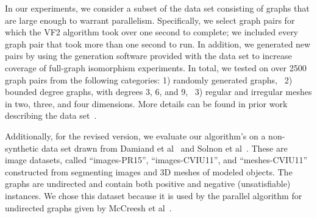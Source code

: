 %
In our experiments, we consider a subset of the data set consisting of
graphs that are large enough to warrant parallelism. 
%
Specifically, we select graph pairs for which the VF2
algorithm took over one second to complete; we included every graph
pair that took more than one second to run.
%
In addition, we generated new pairs by using the generation software
provided with the data set to increase coverage of full-graph
isomorphism experiments.
%
%
%
%
In total, we tested on over 2500 graph pairs from the following
categories:
1) randomly generated graphs,~%
2) bounded degree graphs, with degrees 3, 6, and 9,~
3) regular and irregular meshes in two, three, and four dimensions.
%
%
More details can be found in prior work describing the
data set~\cite{argdatabase1}.

Additionally, for the revised version, we evaluate our algorithm's on
a non-synthetic data set drawn from Damiand et al~\cite{Damiand11} and
Solnon et al~\cite{Solnon15}.
%
These are image datasets, called ``images-PR15'', ``images-CVIU11'',
and ``meshes-CVIU11'' constructed from segmenting images and 3D meshes
of modeled objects.
%
The graphs are undirected and contain both positive and negative
(unsatisfiable) instances.
%
We chose this dataset because it is used by the parallel algorithm for
undirected graphs given by McCreesh et al~\cite{McCreesh15}.
%



